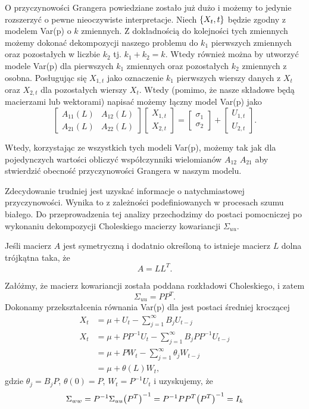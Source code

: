 \documentclass[10pt,a4paper]{book}
\begin{document}
O przyczynowości Grangera powiedziane zostało już dużo i możemy to jedynie rozszerzyć o pewne nieoczywiste interpretacje. Niech $\left\lbrace {{X_t}, {t}} \right\rbrace$ będzie zgodny z modelem Var(p) o $k$ zmiennych. Z dokładnością do kolejności tych zmiennych możemy dokonać dekompozycji naszego problemu do $k_1$ pierwszych zmiennych oraz pozostałych w liczbie $k_2$ tj. $k_1 + k_2 = k$. Wtedy również można by utworzyć modele Var(p) dla pierwszych $k_1$ zmiennych oraz pozostałych $k_2$ zmiennych z osobna. Posługując się $X_{1,t}$ jako oznaczenie $k_1$ pierwszych wierszy danych z $X_t$ oraz $X_{2,t}$ dla pozostałych wierszy $X_{t}$. Wtedy (pomimo, że nasze składowe będą macierzami lub wektorami) napisać możemy łączny model Var(p) jako
$$
\begin{bmatrix}
A_{11}(L) & A_{12}(L) \\
A_{21}(L) & A_{22}(L) 
\end{bmatrix}
\begin{bmatrix}
X_{1,t} \\
X_{2,t}
\end{bmatrix} = \begin{bmatrix}
\sigma_1 \\
\sigma_2
\end{bmatrix} + 
\begin{bmatrix}
U_{1,t} \\
U_{2,t}
\end{bmatrix}.
$$

Wtedy, korzystając ze wszystkich tych modeli Var(p), możemy tak jak dla pojedynczych wartości obliczyć współczynniki wielomianów $A_{12}$ $A_{21}$ aby stwierdzić obecność przyczynowości Grangera w naszym modelu. 

Zdecydowanie trudniej jest uzyskać informacje o natychmiastowej przyczynowości. Wynika to z zależności podefiniowanych w procesach szumu białego. Do przeprowadzenia tej analizy przechodzimy do postaci pomocniczej po wykonaniu dekompozycji Choleskiego macierzy kowariancji $\Sigma_{uu}$.

\begin{definition}
Jeśli macierz $A$ jest symetryczną i dodatnio określoną to istnieje macierz $L$ dolna trójkątna taka, że
$$
A = L L^T.
$$
\end{definition}

Załóżmy, że macierz kowariancji została poddana rozkładowi Choleskiego, i zatem
$$
\Sigma_{uu} = P P^T. 
$$
Dokonamy przekształcenia równania Var(p) dla jest postaci średniej kroczącej
\begin{align*}
X_t &= \mu + U_t - \sum_{j=1}^{\infty} B_j U_{t-j} \\
X_t &= \mu + P P^{-1} U_t - \sum_{j=1}^{\infty} B_j P P^{-1} U_{t-j} \\
&= \mu + P W_t - \sum_{j=1}^{\infty} \theta_j W_{t-j} \\
&= \mu + \theta(L) W_t,
\end{align*}
gdzie $\theta_j = B_j P$, $\theta(0) = P$, $W_t = P^{-1} U_t$ i uzyskujemy, że 
$$
\Sigma_{ww} = P^{-1} \Sigma_{uu} {\left( {P^{T}} \right)}^{-1} = P^{-1} P P^T {\left( {P^{T}} \right)}^{-1} = I_k
$$
\end{document}
